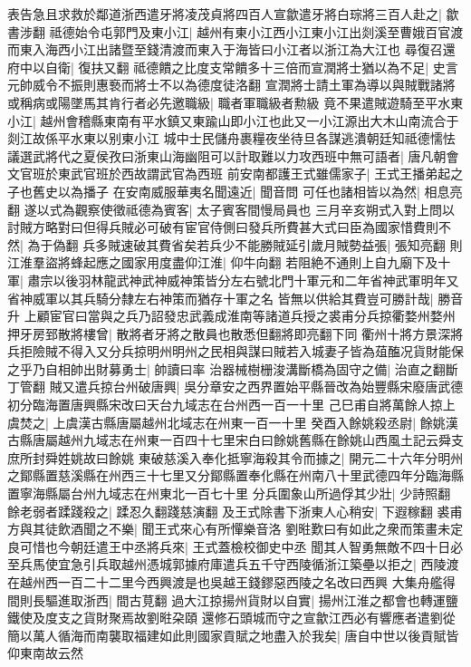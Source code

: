 表告急且求救於鄰道浙西遣牙將凌茂貞將四百人宣歙遣牙將白琮將三百人赴之|{
	歙書涉翻}
祗德始令屯郭門及東小江|{
	越州有東小江西小江東小江出剡溪至曹娥百官渡而東入海西小江出諸暨至錢清渡而東入于海皆曰小江者以浙江為大江也}
尋復召還府中以自衛|{
	復扶又翻}
祗德饋之比度支常饋多十三倍而宣潤將士猶以為不足|{
	史言元帥威令不振則惠䙝而將士不以為德度徒洛翻}
宣潤將士請土軍為導以與賊戰諸將或稱病或陽墜馬其肯行者必先邀職級|{
	職者軍職級者勲級}
竟不果遣賊遊騎至平水東小江|{
	越州會稽縣東南有平水鎮又東踰山即小江也此又一小江源出大木山南流合于剡江故係平水東以别東小江}
城中士民儲舟裹糧夜坐待旦各謀逃潰朝廷知祗德懦怯議選武將代之夏侯孜曰浙東山海幽阻可以計取難以力攻西班中無可語者|{
	唐凡朝會文官班於東武官班於西故謂武官為西班}
前安南都護王式雖儒家子|{
	王式王播弟起之子也舊史以為播子}
在安南威服華夷名聞遠近|{
	聞音問}
可任也諸相皆以為然|{
	相息亮翻}
遂以式為觀察使徵祗德為賓客|{
	太子賓客間慢局員也}
三月辛亥朔式入對上問以討賊方略對曰但得兵賊必可破有宦官侍側曰發兵所費甚大式曰臣為國家惜費則不然|{
	為于偽翻}
兵多賊速破其費省矣若兵少不能勝賊延引歲月賊勢益張|{
	張知亮翻}
則江淮羣盜將蜂起應之國家用度盡仰江淮|{
	仰牛向翻}
若阻絶不通則上自九廟下及十軍|{
	肅宗以後羽林龍武神武神威神策皆分左右號北門十軍元和二年省神武軍明年又省神威軍以其兵騎分隸左右神策而猶存十軍之名}
皆無以供給其費豈可勝計哉|{
	勝音升}
上顧宦官曰當與之兵乃詔發忠武義成淮南等諸道兵授之裘甫分兵掠衢婺州婺州押牙房郅散將樓曾|{
	散將者牙將之散員也散悉但翻將即亮翻下同}
衢州十將方景深將兵拒險賊不得入又分兵掠明州明州之民相與謀曰賊若入城妻子皆為葅醢况貨財能保之乎乃自相帥出財募勇士|{
	帥讀曰率}
治器械樹栅浚溝斷橋為固守之備|{
	治直之翻斷丁管翻}
賊又遣兵掠台州破唐興|{
	吳分章安之西界置始平縣晉改為始豐縣宋廢唐武德初分臨海置唐興縣宋改曰天台九域志在台州西一百一十里}
己巳甫自將萬餘人掠上虞焚之|{
	上虞漢古縣唐屬越州北域志在州東一百一十里}
癸酉入餘姚殺丞尉|{
	餘姚漢古縣唐屬越州九域志在州東一百四十七里宋白曰餘姚舊縣在餘姚山西風土記云舜支庶所封舜姓姚故曰餘姚}
東破慈溪入奉化抵寧海殺其令而據之|{
	開元二十六年分明州之鄮縣置慈溪縣在州西三十七里又分鄮縣置奉化縣在州南八十里武德四年分臨海縣置寧海縣屬台州九域志在州東北一百七十里}
分兵圍象山所過俘其少壯|{
	少詩照翻}
餘老弱者蹂踐殺之|{
	蹂忍久翻踐慈演翻}
及王式除書下浙東人心稍安|{
	下遐稼翻}
裘甫方與其徒飲酒聞之不樂|{
	聞王式來心有所憚樂音洛}
劉暀歎曰有如此之衆而策畫未定良可惜也今朝廷遣王中丞將兵來|{
	王式蓋檢校御史中丞}
聞其人智勇無敵不四十日必至兵馬使宜急引兵取越州憑城郭據府庫遣兵五千守西陵循浙江築壘以拒之|{
	西陵渡在越州西一百二十二里今西興渡是也吳越王錢鏐惡西陵之名改曰西興}
大集舟艦得間則長驅進取浙西|{
	間古莧翻}
過大江掠揚州貨財以自實|{
	揚州江淮之都會也轉運鹽鐵使及度支之貨財聚焉故劉暀朶頤}
還修石頭城而守之宣歙江西必有響應者遣劉從簡以萬人循海而南襲取福建如此則國家貢賦之地盡入於我矣|{
	唐自中世以後貢賦皆仰東南故云然}
